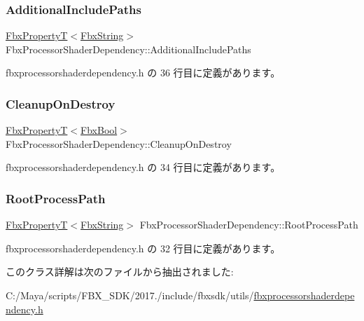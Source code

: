 \subsubsection{\texorpdfstring{Additional\+Include\+Paths}{AdditionalIncludePaths}}
{\footnotesize\ttfamily \hyperlink{class_fbx_property_t}{Fbx\+PropertyT}$<$\hyperlink{class_fbx_string}{Fbx\+String}$>$ Fbx\+Processor\+Shader\+Dependency\+::\+Additional\+Include\+Paths}



 fbxprocessorshaderdependency.\+h の 36 行目に定義があります。

\mbox{\label{class_fbx_processor_shader_dependency_af0bbb628b8b548365fd7d4325f1d4589}} 
\subsubsection{\texorpdfstring{Cleanup\+On\+Destroy}{CleanupOnDestroy}}
{\footnotesize\ttfamily \hyperlink{class_fbx_property_t}{Fbx\+PropertyT}$<$\hyperlink{fbxtypes_8h_a92e0562b2fe33e76a242f498b362262e}{Fbx\+Bool}$>$ Fbx\+Processor\+Shader\+Dependency\+::\+Cleanup\+On\+Destroy}



 fbxprocessorshaderdependency.\+h の 34 行目に定義があります。

\mbox{\label{class_fbx_processor_shader_dependency_a2609315b13014fbba8003185c2e8a5f1}} 
\subsubsection{\texorpdfstring{Root\+Process\+Path}{RootProcessPath}}
{\footnotesize\ttfamily \hyperlink{class_fbx_property_t}{Fbx\+PropertyT}$<$\hyperlink{class_fbx_string}{Fbx\+String}$>$ Fbx\+Processor\+Shader\+Dependency\+::\+Root\+Process\+Path}



 fbxprocessorshaderdependency.\+h の 32 行目に定義があります。



このクラス詳解は次のファイルから抽出されました\+:\begin{DoxyCompactItemize}
\item 
C\+:/\+Maya/scripts/\+F\+B\+X\+\_\+\+S\+D\+K/2017./include/fbxsdk/utils/\hyperlink{fbxprocessorshaderdependency_8h}{fbxprocessorshaderdependency.\+h}\end{DoxyCompactItemize}
